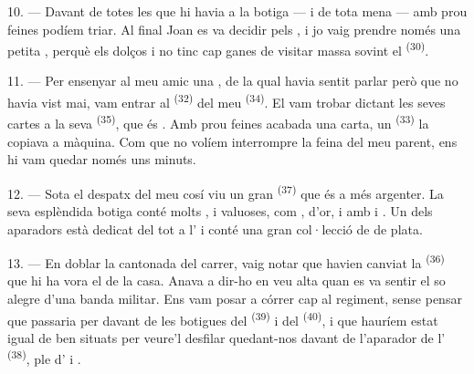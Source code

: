 10. --- Davant de totes les  que hi havia a la botiga ---
 i  de tota mena --- amb
prou feines podíem triar. Al final Joan es va decidir pels , i jo
vaig prendre només una petita , perquè els dolços
 i no tinc cap ganes de visitar massa sovint el
 \textsuperscript{(30)}.

\VUsaut{3.0mm}

11. --- Per ensenyar al meu amic una , de la qual havia sentit
parlar però que no havia vist mai, vam entrar al  \textsuperscript{(32)} del
meu  \textsuperscript{(34)}. El vam trobar dictant les seves cartes a la seva
 \textsuperscript{(35)}, que és . Amb prou feines
acabada una carta, un
 \textsuperscript{(33)} la copiava a màquina. Com que no volíem
interrompre la feina del meu parent, ens hi vam quedar només uns minuts.

12. --- Sota el despatx del meu cosí viu un gran 
\textsuperscript{(37)} que és a més argenter. La seva esplèndida botiga conté molts
,
 i  valuoses, com ,
 d'or,  i  amb  i . Un dels aparadors està dedicat del tot a l'
i conté una gran col·lecció de  de plata.

13. --- En doblar la cantonada del carrer, vaig notar que havien canviat la
 \textsuperscript{(36)} que hi ha vora el  de la casa.
Anava a dir-ho en veu alta quan es va sentir el so alegre d'una banda militar. Ens vam posar a
córrer cap al regiment, sense pensar que passaria per davant de les botigues del
 \textsuperscript{(39)} i del  \textsuperscript{(40)}, i que
hauríem estat igual de ben situats per veure'l desfilar quedant-nos davant de l'aparador de
l' \textsuperscript{(38)}, ple d' i
.

\VUsaut{3.0mm}

